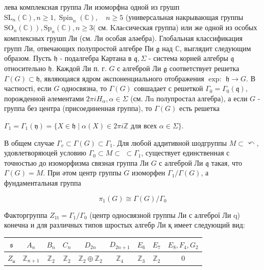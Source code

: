 \documentclass[10pt]{article}
\begin{document}
лева комплексная группа Ли изоморфна одной из грушп $\mathrm{SL}_{n}(\mathbb{C}), n \geqslant 1, \operatorname{Spin}_{n}(\mathbb{C}), \quad n \geqslant 5$ (универсальная накрывающая группы $\left.\mathrm{SO}_{n}(\mathbb{C})\right), \mathrm{Sp}_{n}(\mathbb{C}), n \geqslant 3($ см. Kлаcсическая группа) или же одной из особых комплексных грушп Ли (см. Ли особая аләебра). Глобальная классификация групп Ли, отвечающих полупростой алгебре Пи $\mathfrak{g}$ над $\mathbb{C}$, выглядит следующим образом. Пусть $\mathfrak{h}$ - подалгебра Картана в $\mathfrak{q}, \Sigma$ - система корней алгебры $\mathfrak{q}$ относительно $\mathfrak{h}$. Каждой Ли п. г. $G$ с алгеброй Ли $\mathfrak{g}$ соответствует решетка $\Gamma(G) \subset \mathfrak{h}$, являюцаяся ядром әкспоненциального отображения $\operatorname{exp:~} \mathfrak{h} \rightarrow G$. В частності, если $G$ односвязна, то $\Gamma(G)$ совшадает с решеткой $\Gamma_{0}=\Gamma_{0}(\mathfrak{q})$, порожденной әлементами $2 \pi i H_{\alpha}, \alpha \in \Sigma$ (см. Лu полупростал алгебра), а если $G$ - группа без центра (присоединенная группа), то $\Gamma(G)$ есть решетка



$\Gamma_{1}=\Gamma_{1}(\mathfrak{y})=\{X \in \mathfrak{h} \mid \alpha(X) \in 2 \pi i \mathbb{Z}$ для всех $\alpha \in \Sigma\}$.



В общем случае $\Gamma_{v} \subset \Gamma(G) \subset \Gamma_{1}$. Для любой аддитивной шодгруппы $M \subset \curvearrowleft$, удовлетворяюцей условию $\Gamma_{0} \subset M \subset$ $\subset \Gamma_{1}$, существует единственная с точностью до изоморфизма связная группа Ли $G$ с алгеброй Ли $\mathfrak{q}$ такая, что $\Gamma(G)=M$. При әтом центр группы $G$ изоморфен $\Gamma_{1} / \Gamma(G)$, а фундаментальная группа



\[

\pi_{1}(G) \cong \Gamma(G) / \Gamma_{0}

\]



Факторгруппа $Z_{1 \mathrm{t}}=\Gamma_{1} / \Gamma_{0}$ (центр односвязной группы Ли с алгеброї Ли q) конечна и для различных типов шростых алгебр Ли қ имеет следующий вид:



\begin{center}

\begin{tabular}{c|c|c|c|c|c|c|c|c}

$\mathfrak{s}$ & $A_{n}$ & $B_{n}$ & $C_{n}$ & $D_{2 n}$ & $D_{2 n+1}$ & $E_{6}$ & $E_{7}$ & $E_{8}, F_{4}, G_{2}$ \\

\hline

$Z_{\mathfrak{u}}$ & $\mathbb{Z}_{n+1}$ & $\mathbb{Z}_{2}$ & $\mathbb{Z}_{2}$ & $\mathbb{Z}_{2} \oplus \mathbb{Z}_{2}$ & $\mathbb{Z}_{4}$ & $\mathbb{Z}_{3}$ & $\mathbb{Z}_{2}$ & 0 \\

\hline

\end{tabular}

\end{center}
\end{document}
